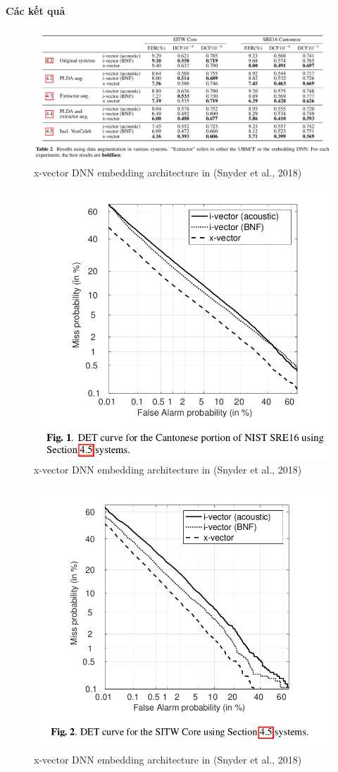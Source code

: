 \documentclass{article}
\begin{document}
	\textbf{Các kết quả}
	\begin{figure}[H]
		\centering
		\includegraphics[width=1\linewidth]{images/x-vectors-result-table-02.png}
		\caption{x-vector DNN embedding architecture in (Snyder et al., 2018)}
		\label{fig:writing-thesis}
	\end{figure}
	\begin{figure}[H]
		\centering
		\includegraphics[width=0.75\linewidth]{images/x-vectors-fig-01.png}
		\caption{x-vector DNN embedding architecture in (Snyder et al., 2018)}
		\label{fig:writing-thesis}
	\end{figure}
	\begin{figure}[H]
		\centering
		\includegraphics[width=0.75\linewidth]{images/x-vectors-fig-02.png}
		\caption{x-vector DNN embedding architecture in (Snyder et al., 2018)}
		\label{fig:writing-thesis}
	\end{figure}
	
\end{document}
